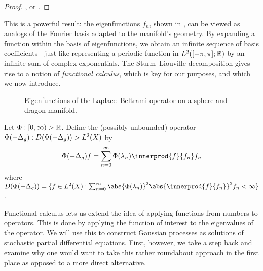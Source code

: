 \documentclass[11pt]{book}
\begin{document}
\begin{proof}
\textcite[139]{chavel84}, or \textcite[Theorem 44]{canzani13}.
\end{proof}

This is a powerful result: the eigenfunctions $f_n$, shown in , can be viewed as analogs of the Fourier basis adapted to the manifold's geometry.
By expanding a function within the basis of eigenfunctions, we obtain an infinite sequence of basis coefficients---just like representing a periodic function in $L^2([-\pi,\pi];\mathbb{R})$ by an infinite sum of complex exponentials.
The Sturm--Liouville decomposition gives rise to a notion of \emph{functional calculus}, which is key for our purposes, and which we now introduce.


\begin{figure}
\tikzset{external/export next=false}
\caption[Laplace--Beltrami eigenfunctions: sphere and dragon manifold]{Eigenfunctions of the Laplace--Beltrami operator on a sphere and dragon manifold.}
\label{fig:eig-s2-dr}
\end{figure}

\label{ntn:functional-calculus}
\begin{definition}
Let $\Phi : [0,\infty) \-> \mathbb{R}$. 
Define the (possibly unbounded) operator $\Phi(-\Delta_g) : D(\Phi(-\Delta_g)) \-> L^2(X)$ by
\[
\Phi(-\lap_g) f = \sum_{n=0}^\infty \Phi(\lambda_n) \innerprod{f}{f_n} f_n
\]
where $D(\Phi(-\lap_g)) = \{f \in L^2(X) : \sum_{n=0}^\infty \abs{\Phi(\lambda_n)}^2 \abs{\innerprod{f}{f_n}}^2 f_n < \infty\}$.
\end{definition}

Functional calculus lets us extend the idea of applying functions from numbers to operators.
This is done by applying the function of interest to the eigenvalues of the operator.
We will use this to construct Gaussian processes as solutions of stochastic partial differential equations.
First, however, we take a step back and examine why one would want to take this rather roundabout approach in the first place as opposed to a more direct alternative.
\end{document}
